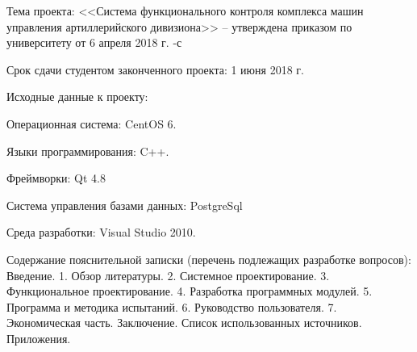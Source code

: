 {    \begin{flushleft}
	    \begin{legal}[leftmargin=*,label={\arabic*}]
	    \item Тема проекта: <<Система функционального контроля комплекса машин управления артиллерийского дивизиона>> --
		    утверждена приказом по университету от 6 апреля 2018 г. -с

		    \vspace{1em}

	    \item Срок сдачи студентом законченного проекта: 1 июня 2018 г.

		    \vspace{1em}

	    \item Исходные данные к проекту:

		    \begin{legal}[label*={.\arabic*}]
		    \item Операционная система: CentOS 6.
		    \item Языки программирования: C++.
		    \item Фреймворки: Qt 4.8
		    \item Система управления базами данных: PostgreSql
		    \item Среда разработки: Visual Studio 2010.
		    \end{legal}

		    \vspace{1em}

	    \item Содержание пояснительной записки (перечень подлежащих разработке вопросов):
		    Введение.
		    1. Обзор литературы.
		    2. Системное проектирование.
		    3. Функциональное проектирование.
		    4. Разработка программных модулей.
		    5. Программа и методика испытаний.
		    6. Руководство пользователя.
		    7. Экономическая часть.
		    Заключение.
		    Список использованных источников.
		    Приложения.

		    \vspace{1em}


\end{legal}
\end{flushleft}}
